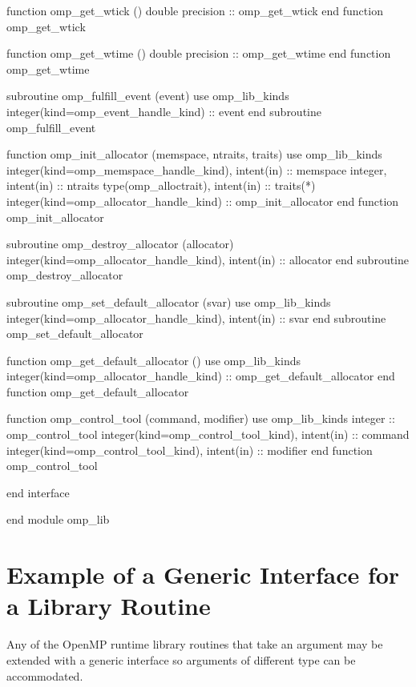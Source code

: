 {\begin{ompfFunction}
    function omp_get_wtick ()
      double precision :: omp_get_wtick
    end function omp_get_wtick

    function omp_get_wtime ()
      double precision :: omp_get_wtime
    end function omp_get_wtime

    subroutine omp_fulfill_event (event)
      use omp_lib_kinds
      integer(kind=omp_event_handle_kind) :: event
    end subroutine omp_fulfill_event

    function omp_init_allocator (memspace, ntraits, traits)
      use omp_lib_kinds
      integer(kind=omp_memspace_handle_kind), intent(in) :: memspace
      integer, intent(in) :: ntraits
      type(omp_alloctrait), intent(in) :: traits(*)
      integer(kind=omp_allocator_handle_kind) :: omp_init_allocator
    end function omp_init_allocator

    subroutine omp_destroy_allocator (allocator)
      integer(kind=omp_allocator_handle_kind), intent(in) :: allocator
    end subroutine omp_destroy_allocator

    subroutine omp_set_default_allocator (svar)
      use omp_lib_kinds
      integer(kind=omp_allocator_handle_kind), intent(in) :: svar
    end subroutine omp_set_default_allocator

    function omp_get_default_allocator ()
      use omp_lib_kinds
      integer(kind=omp_allocator_handle_kind) :: omp_get_default_allocator
    end function omp_get_default_allocator

    function omp_control_tool (command, modifier)
      use omp_lib_kinds
      integer :: omp_control_tool
      integer(kind=omp_control_tool_kind), intent(in) :: command
      integer(kind=omp_control_tool_kind), intent(in) :: modifier
    end function omp_control_tool

  end interface

end module omp_lib
\end{ompfFunction}} %






\section{Example of a Generic Interface for a Library Routine}
\label{sec:Example of a Generic Interface for a Library Routine}
Any of the OpenMP runtime library routines that take an argument may be extended
with a generic interface so arguments of different  type can be accommodated.

